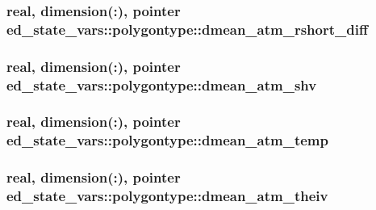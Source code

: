 \subsubsection[{\texorpdfstring{dmean\+\_\+atm\+\_\+rshort\+\_\+diff}{dmean_atm_rshort_diff}}]{\setlength{\rightskip}{0pt plus 5cm}real, dimension(\+:), pointer ed\+\_\+state\+\_\+vars\+::polygontype\+::dmean\+\_\+atm\+\_\+rshort\+\_\+diff}\hypertarget{structed__state__vars_1_1polygontype_ad95cf4c0bae677989448168b8d389a92}{}\label{structed__state__vars_1_1polygontype_ad95cf4c0bae677989448168b8d389a92}
\subsubsection[{\texorpdfstring{dmean\+\_\+atm\+\_\+shv}{dmean_atm_shv}}]{\setlength{\rightskip}{0pt plus 5cm}real, dimension(\+:), pointer ed\+\_\+state\+\_\+vars\+::polygontype\+::dmean\+\_\+atm\+\_\+shv}\hypertarget{structed__state__vars_1_1polygontype_aba9b4616f699b2a876b3da578964e703}{}\label{structed__state__vars_1_1polygontype_aba9b4616f699b2a876b3da578964e703}
\subsubsection[{\texorpdfstring{dmean\+\_\+atm\+\_\+temp}{dmean_atm_temp}}]{\setlength{\rightskip}{0pt plus 5cm}real, dimension(\+:), pointer ed\+\_\+state\+\_\+vars\+::polygontype\+::dmean\+\_\+atm\+\_\+temp}\hypertarget{structed__state__vars_1_1polygontype_a2641a9ec4e6917ad2916fa09f03aac9f}{}\label{structed__state__vars_1_1polygontype_a2641a9ec4e6917ad2916fa09f03aac9f}
\subsubsection[{\texorpdfstring{dmean\+\_\+atm\+\_\+theiv}{dmean_atm_theiv}}]{\setlength{\rightskip}{0pt plus 5cm}real, dimension(\+:), pointer ed\+\_\+state\+\_\+vars\+::polygontype\+::dmean\+\_\+atm\+\_\+theiv}\hypertarget{structed__state__vars_1_1polygontype_af392622dde1462f7c0a39db5f4480b1a}{}\label{structed__state__vars_1_1polygontype_af392622dde1462f7c0a39db5f4480b1a}
